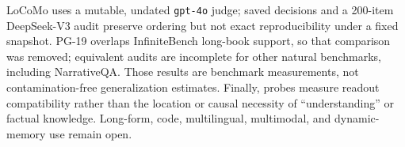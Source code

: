 LoCoMo uses a mutable, undated \texttt{gpt-4o} judge; saved decisions and a
200-item DeepSeek-V3 audit preserve ordering but not exact reproducibility under
a fixed snapshot. PG-19 overlaps InfiniteBench long-book support, so that
comparison was removed; equivalent audits are incomplete for other natural
benchmarks, including NarrativeQA. Those results are benchmark measurements,
not contamination-free generalization estimates. Finally, probes measure
readout compatibility rather than the location or causal necessity of
``understanding'' or factual knowledge. Long-form, code, multilingual,
multimodal, and dynamic-memory use remain open.
